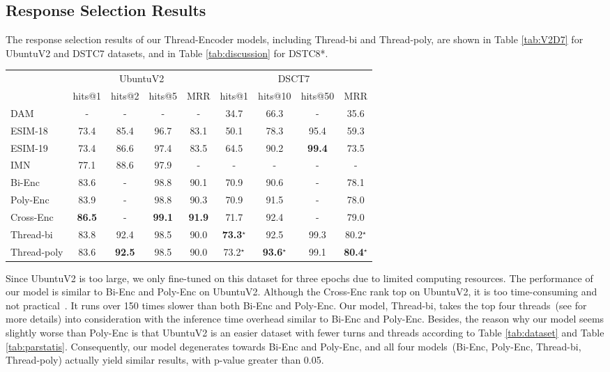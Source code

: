 \subsection{Response Selection Results}
The response selection results of our Thread-Encoder models, including Thread-bi and Thread-poly, are shown in Table \ref{tab:V2D7} for UbuntuV2 and DSTC7 datasets, and in Table \ref{tab:discussion} for DSTC8*. 
\begin{table*}[ht!]
	\centering
	\small
	\begin{tabular}{l|cccc|cccc}
		\toprule[1pt]
		\multirow{2}{*}{} &
		\multicolumn{4}{c|}{UbuntuV2} &
		\multicolumn{4}{c}{DSCT7}\\ 
		Model &  hits@1 & hits@2 & hits@5 & MRR& hits@1 & hits@10 & hits@50 & MRR\\
		\midrule[1pt]
		DAM & - & -& -& - &  34.7 & 66.3 & - & 35.6\\
		ESIM-18 &  73.4 & 85.4 & 96.7 & 83.1 & 50.1 & 78.3 & 95.4 & 59.3 \\
		ESIM-19& 73.4 & 86.6& 97.4& 83.5 & 64.5 & 90.2 & \bf 99.4 & 73.5 \\
		IMN &  77.1 & 88.6 & 97.9 &- & -& -& -&- \\
		Bi-Enc & 83.6 & - &  98.8 & 90.1  &70.9 & 90.6 &  - & 78.1\\
		Poly-Enc & 83.9 & - & 98.8 & 90.3 &70.9 & 91.5 & - & 78.0\\
		Cross-Enc & \bf 86.5 & - & \bf 99.1 & \bf 91.9&71.7 & 92.4 & - & 79.0 \\
		\hline
		Thread-bi	& 83.8 &  92.4 & 98.5 & 90.0 & \bf 73.3$^\star$ &92.5 & 99.3 & 80.2$^\star$ \\
		Thread-poly & 83.6&\bf 92.5 &98.5 &90.0 &73.2$^\star$& \bf  93.6$^\star$&99.1& \bf80.4$^\star$\\
		\bottomrule[1pt]
	\end{tabular}
	\caption{Results on UbuntuV2 and DSTC7 dataset. Scores marked with $^\star$ are statistically significantly better than the state-of-the-art 
		with $p<0.05$ according to t-test.}
	\label{tab:V2D7}
\end{table*}

Since UbuntuV2 is too large, we only fine-tuned on this dataset for three epochs due to limited computing resources.
The performance of our model is similar to Bi-Enc and Poly-Enc on UbuntuV2.
Although the Cross-Enc rank top on UbuntuV2, it is too time-consuming and 
not practical~\cite{humeau2019poly}. It runs over 150 times slower than both Bi-Enc 
and Poly-Enc. Our model, Thread-bi, takes the top four threads~(see  for more details) 
into consideration with the inference time overhead similar to Bi-Enc and Poly-Enc. 
Besides, the reason why our model seems slightly worse than Poly-Enc is that UbuntuV2 is an easier dataset with fewer turns and threads according to Table \ref{tab:dataset} and Table \ref{tab:parstatis}. Consequently, our model degenerates towards Bi-Enc and Poly-Enc, and all four models~(Bi-Enc, Poly-Enc, Thread-bi, Thread-poly) actually yield similar results, with p-value greater than 0.05.





